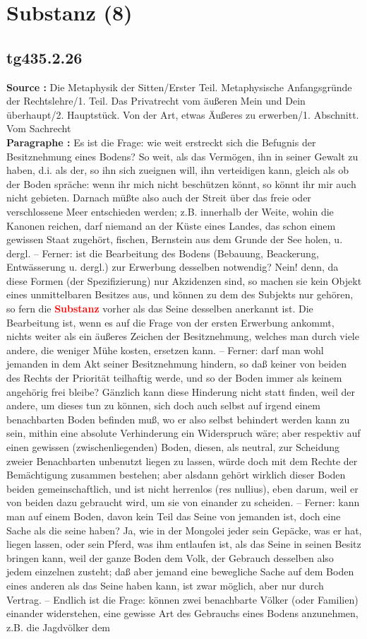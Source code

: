 \documentclass[a4paper,12pt,twoside]{book}
\newcommand{\match}[1]{\textcolor{red}{\textbf{#1}}}
\newcommand{\unnumberedsection}[1]{
	\section*{#1}
	\addcontentsline{toc}{section}{#1}
	\markright{#1}
}
\begin{document}
	\unnumberedsection{Substanz (8)} 
	\subsection*{tg435.2.26} 
	\textbf{Source : }Die Metaphysik der Sitten/Erster Teil. Metaphysische Anfangsgründe der Rechtslehre/1. Teil. Das Privatrecht vom äußeren Mein und Dein überhaupt/2. Hauptstück. Von der Art, etwas Äußeres zu erwerben/1. Abschnitt. Vom Sachrecht\\  
	
	\textbf{Paragraphe : }Es ist die Frage: wie weit erstreckt sich die Befugnis der Besitznehmung eines Bodens? So weit, als das Vermögen, ihn in seiner Gewalt zu haben, d.i. als der, so ihn sich zueignen will, ihn verteidigen kann, gleich als ob der Boden spräche: wenn ihr mich nicht beschützen könnt, so könnt ihr mir auch nicht gebieten. Darnach müßte also auch der Streit über das freie oder verschlossene Meer entschieden werden; z.B. innerhalb der Weite, wohin die Kanonen reichen, darf niemand an der Küste eines Landes, das schon einem gewissen  Staat zugehört, fischen, Bernstein aus dem Grunde der See holen, u. dergl. – Ferner: ist die Bearbeitung des Bodens (Bebauung, Beackerung, Entwässerung u. dergl.) zur Erwerbung desselben notwendig? Nein! denn, da diese Formen (der Spezifizierung) nur Akzidenzen sind, so machen sie kein Objekt eines unmittelbaren Besitzes aus, und können zu dem des Subjekts nur gehören, so fern die \match{Substanz} vorher als das Seine desselben anerkannt ist. Die Bearbeitung ist, wenn es auf die Frage von der ersten Erwerbung ankommt, nichts weiter als ein äußeres Zeichen der Besitznehmung, welches man durch viele andere, die weniger Mühe kosten, ersetzen kann. – Ferner: darf man wohl jemanden in dem Akt seiner Besitznehmung hindern, so daß keiner von beiden des Rechts der Priorität teilhaftig werde, und so der Boden immer als keinem angehörig frei bleibe? Gänzlich kann diese Hinderung nicht statt finden, weil der andere, um dieses tun zu können, sich doch auch selbst auf irgend einem benachbarten Boden befinden muß, wo er also selbst behindert werden kann zu sein, mithin eine absolute Verhinderung ein Widerspruch wäre; aber respektiv auf einen gewissen (zwischenliegenden) Boden, diesen, als neutral, zur Scheidung zweier Benachbarten unbenutzt liegen zu lassen, würde doch mit dem Rechte der Bemächtigung zusammen bestehen; aber alsdann gehört wirklich dieser Boden beiden gemeinschaftlich, und ist nicht herrenlos (res nullius), eben darum, weil er von beiden dazu gebraucht wird, um sie von einander zu scheiden. – Ferner: kann man auf einem Boden, davon kein Teil das Seine von jemanden ist, doch eine Sache als die seine haben? Ja, wie in der Mongolei jeder sein Gepäcke, was er hat, liegen lassen, oder sein Pferd, was ihm entlaufen ist, als das Seine in seinen Besitz bringen kann, weil der ganze Boden dem Volk, der Gebrauch desselben also jedem einzelnen zusteht; daß aber jemand eine bewegliche Sache auf dem Boden eines anderen als das Seine haben kann, ist zwar möglich, aber nur durch Vertrag. – Endlich ist die Frage: können zwei benachbarte  Völker (oder Familien) einander widerstehen, eine gewisse Art des Gebrauchs eines Bodens anzunehmen, z.B. die Jagdvölker dem 
\end{document}
